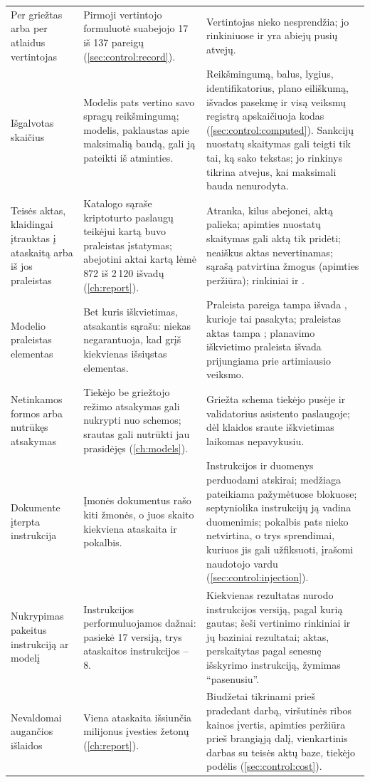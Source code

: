 \begin{xltabular}{\textwidth}{@{}L{34mm}YL{50mm}@{}}
Per griežtas arba per atlaidus vertintojas & Pirmoji vertintojo formuluotė suabejojo 17 iš 137 pareigų (\cref{sec:control:record}). & Vertintojas nieko nesprendžia; jo rinkiniuose  ir  yra abiejų pusių atvejų. \\
Išgalvotas skaičius & Modelis pats vertino savo spragų reikšmingumą; modelis, paklaustas apie maksimalią baudą, gali ją pateikti iš atminties. & Reikšmingumą, balus, lygius, identifikatorius, plano eiliškumą, išvados pasekmę ir visą veiksmų registrą apskaičiuoja kodas (\cref{sec:control:computed}). Sankcijų nuostatų skaitymas gali teigti tik tai, ką sako tekstas; jo rinkinys tikrina atvejus, kai maksimali bauda nenurodyta. \\
Teisės aktas, klaidingai įtrauktas į ataskaitą arba iš jos praleistas & Katalogo sąraše kriptoturto paslaugų teikėjui kartą buvo praleistas įstatymas; abejotini aktai kartą lėmė 872 iš 2\,120 išvadų (\cref{ch:report}). & Atranka, kilus abejonei, aktą palieka; apimties nuostatų skaitymas gali aktą tik pridėti; neaiškus aktas nevertinamas; sąrašą patvirtina žmogus (apimties peržiūra); rinkiniai  ir . \\
Modelio praleistas elementas & Bet kuris iškvietimas, atsakantis sąrašu: niekas negarantuoja, kad grįš kiekvienas išsiųstas elementas. & Praleista pareiga tampa išvada , kurioje tai pasakyta; praleistas aktas tampa ; planavimo iškvietimo praleista išvada prijungiama prie artimiausio veiksmo. \\
Netinkamos formos arba nutrūkęs atsakymas & Tiekėjo be griežtojo režimo atsakymas gali nukrypti nuo schemos; srautas gali nutrūkti jau prasidėjęs (\cref{ch:models}). & Griežta schema tiekėjo pusėje ir validatorius asistento paslaugoje; dėl klaidos sraute iškvietimas laikomas nepavykusiu. \\
Dokumente įterpta instrukcija & Įmonės dokumentus rašo kiti žmonės, o juos skaito kiekviena ataskaita ir pokalbis. & Instrukcijos ir duomenys perduodami atskirai; medžiaga pateikiama pažymėtuose blokuose; septyniolika instrukcijų ją vadina duomenimis; pokalbis pats nieko netvirtina, o trys sprendimai, kuriuos jis gali užfiksuoti, įrašomi naudotojo vardu (\cref{sec:control:injection}). \\
Nukrypimas pakeitus instrukciją ar modelį & Instrukcijos performuluojamos dažnai:  pasiekė 17 versiją, trys ataskaitos instrukcijos -- 8. & Kiekvienas rezultatas nurodo instrukcijos versiją, pagal kurią gautas; šeši vertinimo rinkiniai ir jų baziniai rezultatai; aktas, perskaitytas pagal senesnę išskyrimo instrukciją, žymimas \enquote{pasenusiu}. \\
Nevaldomai augančios išlaidos & Viena ataskaita išsiunčia milijonus įvesties žetonų (\cref{ch:report}). & Biudžetai tikrinami prieš pradedant darbą, viršutinės ribos kainos įvertis, apimties peržiūra prieš brangiąją dalį, vienkartinis darbas su teisės aktų baze, tiekėjo podėlis (\cref{sec:control:cost}). \\
\end{xltabular}


